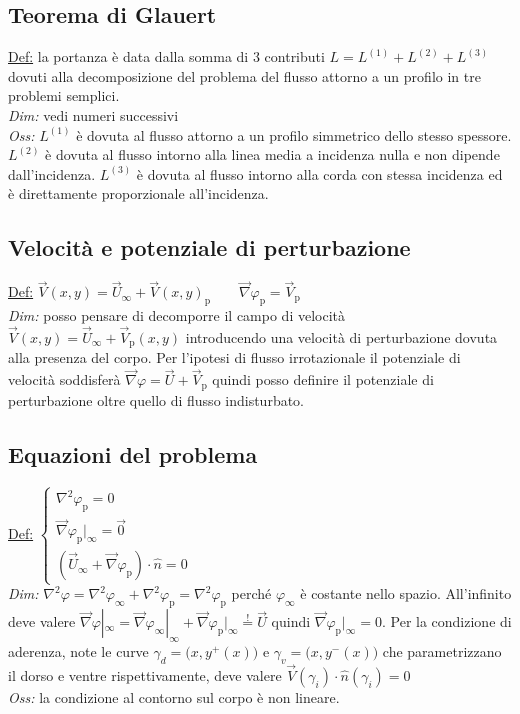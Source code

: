\documentclass[11pt,a4paper]{report}
\begin{document}
		\subsection{Teorema di Glauert}
		\underline{Def:} la portanza è data dalla somma di 3 contributi $L=L^{(1)}+L^{(2)}+L^{(3)}$ dovuti alla decomposizione del problema del flusso attorno a un profilo in tre problemi semplici.\\
		\textit{Dim:} vedi numeri successivi\\
		\textit{Oss:} $L^{(1)}$ è dovuta al flusso attorno a un profilo simmetrico dello stesso spessore. $L^{(2)}$ è dovuta al flusso intorno alla linea media a incidenza nulla e non dipende dall'incidenza. $L^{(3)}$ è dovuta al flusso intorno alla corda con stessa incidenza ed è direttamente proporzionale all'incidenza.
		\subsection{Velocità e potenziale di perturbazione}
		\underline{Def:} $\vec V(x,y)=\vec U_\infty+\vec V(x,y)_\mathrm p\qquad\vec\nabla\varphi_\mathrm p=\vec V_\mathrm p$\\
		\textit{Dim:} posso pensare di decomporre il campo di velocità $\vec V(x,y)=\vec U_\infty+\vec V_\mathrm p(x,y)$ introducendo una velocità di perturbazione dovuta alla presenza del corpo. Per l'ipotesi di flusso irrotazionale il potenziale di velocità soddisferà $\vec\nabla\varphi=\vec U+\vec V_\mathrm p$ quindi posso definire il potenziale di perturbazione oltre quello di flusso indisturbato.
		\subsection{Equazioni del problema}
		\underline{Def:} $\begin{cases}\nabla^2\varphi_\mathrm p=0\\\vec\nabla\varphi_\mathrm p|_\infty=\vec 0\\(\vec U_\infty+\vec\nabla\varphi_\mathrm p)\cdot\hat n=0\end{cases}$\\
		\textit{Dim:} $\nabla^2\varphi=\nabla^2\varphi_\infty+\nabla^2\varphi_\mathrm p=\nabla^2\varphi_\mathrm p$ perché $\varphi_\infty$ è costante nello spazio. All'infinito deve valere $\vec\nabla\varphi|_\infty=\vec\nabla\varphi_\infty|_\infty+\vec\nabla\varphi_\mathrm p|_\infty\overset{!}{=}\vec U$ quindi $\vec\nabla\varphi_\mathrm p|_\infty=0$. Per la condizione di aderenza, note le curve $\gamma_d=\big(x,y^+(x)\big)$ e $\gamma_v=\big(x,y^-(x)\big)$ che parametrizzano il dorso e ventre rispettivamente, deve valere $\vec V(\gamma_i)\cdot\hat n(\gamma_i)=0$\\
		\textit{Oss:} la condizione al contorno sul corpo è non lineare.
\end{document}
